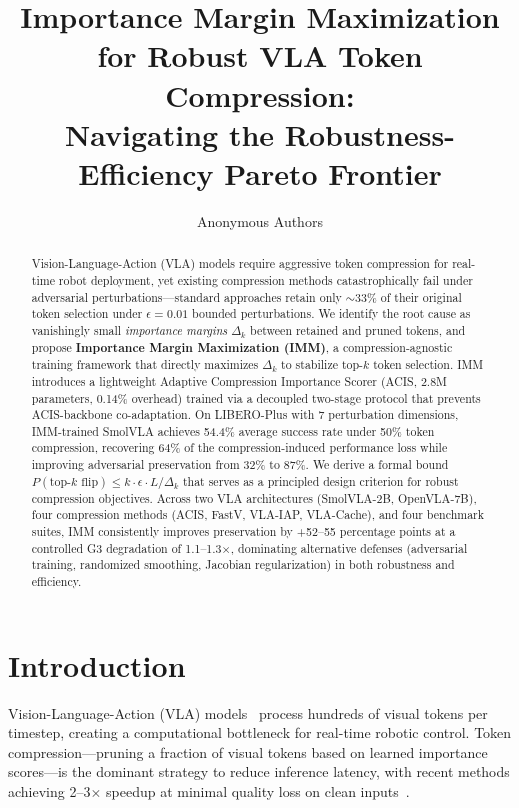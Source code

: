 \documentclass[10pt,twocolumn]{article}
\title{Importance Margin Maximization for Robust VLA Token Compression:\\Navigating the Robustness-Efficiency Pareto Frontier}
\author{
  Anonymous Authors
}
\begin{document}
\maketitle

\begin{abstract}
Vision-Language-Action (VLA) models require aggressive token compression for real-time robot deployment, yet existing compression methods catastrophically fail under adversarial perturbations---standard approaches retain only $\sim$33\% of their original token selection under $\epsilon{=}0.01$ bounded perturbations.
We identify the root cause as vanishingly small \emph{importance margins} $\Delta_k$ between retained and pruned tokens, and propose \textbf{Importance Margin Maximization (IMM)}, a compression-agnostic training framework that directly maximizes $\Delta_k$ to stabilize top-$k$ token selection.
IMM introduces a lightweight Adaptive Compression Importance Scorer (ACIS, 2.8M parameters, 0.14\% overhead) trained via a decoupled two-stage protocol that prevents ACIS-backbone co-adaptation.
On LIBERO-Plus with 7 perturbation dimensions, IMM-trained SmolVLA achieves 54.4\% average success rate under 50\% token compression, recovering 64\% of the compression-induced performance loss while improving adversarial preservation from 32\% to 87\%.
We derive a formal bound $P(\text{top-}k\text{ flip}) \leq k \cdot \epsilon \cdot L / \Delta_k$ that serves as a principled design criterion for robust compression objectives.
Across two VLA architectures (SmolVLA-2B, OpenVLA-7B), four compression methods (ACIS, FastV, VLA-IAP, VLA-Cache), and four benchmark suites, IMM consistently improves preservation by +52--55 percentage points at a controlled G3 degradation of 1.1--1.3$\times$, dominating alternative defenses (adversarial training, randomized smoothing, Jacobian regularization) in both robustness and efficiency.
\end{abstract}

\section{Introduction}
\label{sec:intro}

Vision-Language-Action (VLA) models~\cite{brohan2023rt2,kim2024openvla} process hundreds of visual tokens per timestep, creating a computational bottleneck for real-time robotic control. Token compression---pruning a fraction of visual tokens based on learned importance scores---is the dominant strategy to reduce inference latency, with recent methods achieving 2--3$\times$ speedup at minimal quality loss on clean inputs~\cite{chen2024fastv,zheng2024vlacache}.
\end{document}

